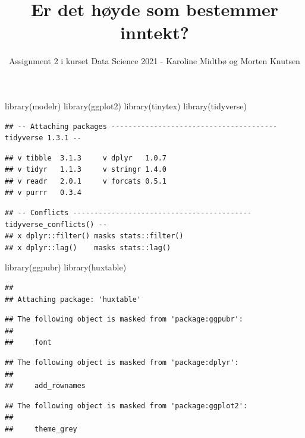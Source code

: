 \documentclass[
  12pt,
  norsk,
]{article}
\title{Er det høyde som bestemmer inntekt?}
\author{Assignment 2 i kurset Data Science 2021 - Karoline Midtbø og
Morten Knutsen}
\date{}
\newenvironment{Shaded}{\begin{snugshade}}{\end{snugshade}}
\newcommand{\FunctionTok}[1]{\textcolor[rgb]{0.00,0.00,0.00}{#1}}
\newcommand{\NormalTok}[1]{#1}
\begin{document}
\maketitle

\begin{Shaded}
\begin{Highlighting}[]
\FunctionTok{library}\NormalTok{(modelr)}
\FunctionTok{library}\NormalTok{(ggplot2)}
\FunctionTok{library}\NormalTok{(tinytex)}
\FunctionTok{library}\NormalTok{(tidyverse)}
\end{Highlighting}
\end{Shaded}

\begin{verbatim}
## -- Attaching packages --------------------------------------- tidyverse 1.3.1 --
\end{verbatim}

\begin{verbatim}
## v tibble  3.1.3     v dplyr   1.0.7
## v tidyr   1.1.3     v stringr 1.4.0
## v readr   2.0.1     v forcats 0.5.1
## v purrr   0.3.4
\end{verbatim}

\begin{verbatim}
## -- Conflicts ------------------------------------------ tidyverse_conflicts() --
## x dplyr::filter() masks stats::filter()
## x dplyr::lag()    masks stats::lag()
\end{verbatim}

\begin{Shaded}
\begin{Highlighting}[]
\FunctionTok{library}\NormalTok{(ggpubr)}
\FunctionTok{library}\NormalTok{(huxtable)}
\end{Highlighting}
\end{Shaded}

\begin{verbatim}
## 
## Attaching package: 'huxtable'
\end{verbatim}

\begin{verbatim}
## The following object is masked from 'package:ggpubr':
## 
##     font
\end{verbatim}

\begin{verbatim}
## The following object is masked from 'package:dplyr':
## 
##     add_rownames
\end{verbatim}

\begin{verbatim}
## The following object is masked from 'package:ggplot2':
## 
##     theme_grey
\end{verbatim}
\end{document}

